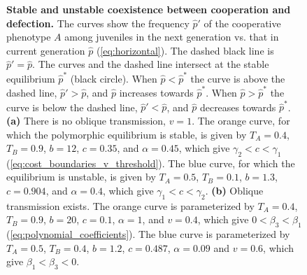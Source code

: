\documentclass[12pt]{extarticle}
\begin{document}
\begin{figure}[p]
  \caption{\textbf{Stable and unstable coexistence between cooperation and defection.}
  The curves show the frequency $\hat{p}'$ of the cooperative phenotype $A$ among juveniles in the next generation vs. that in current generation $\hat{p}$ (\autoref{eq:horizontal}).
  The dashed black line is $\hat{p}'=\hat{p}$.
  The curves and the dashed line intersect at the stable equilibrium $\hat{p}^*$ (black circle).
  When $\hat{p} < \hat{p}^*$ the curve is above the dashed line, $\hat{p}' > \hat{p}$, and $\hat{p}$ increases towards $\hat{p}^*$.
  When $\hat{p} > \hat{p}^*$ the curve is below the dashed line, $\hat{p}' < \hat{p}$, and $\hat{p}$ decreases towards $\hat{p}^*$.
  \textbf{(a)} There is no oblique transmission, $v=1$.
  The orange curve, for which the polymorphic equilibrium is stable, is given by $T_A = 0.4$, $T_B = 0.9$, $b = 12$, $c=0.35$, and $\alpha = 0.45$, which give $\gamma_2<c<\gamma_1$ (\autoref{eq:cost_boundaries_v_threshold}).
  The blue curve, for which the equilibrium is unstable, is given by $T_A = 0.5$, $T_B = 0.1$, $b = 1.3$, $c=0.904$, and $\alpha = 0.4$, which give $\gamma_1<c<\gamma_2$.
  \textbf{(b)} Oblique transmission exists. 
  The orange curve is parameterized by $T_A = 0.4$, $T_B = 0.9$, $b = 20$, $c=0.1$, $\alpha = 1$, and $v=0.4$, which give $0<\beta_3<\beta_1$ (\autoref{eq:polynomial_coefficients}).
  The blue curve is parameterized by $T_A = 0.5$, $T_B = 0.4$, $b=1.2$, $c=0.487$, $\alpha = 0.09$ and $v=0.6$, which give $\beta_1<\beta_3<0$.
  }
  \label{fig:coexistence_recursive}
  \end{figure}
\end{document}
